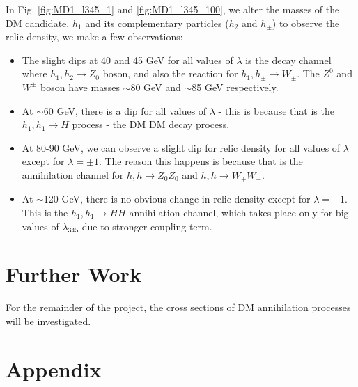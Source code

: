 \documentclass[12pt]{article}
\begin{document}
In Fig. \ref{fig:MD1_l345_1} and \ref{fig:MD1_l345_100}, we alter the masses of the DM candidate, $h_1$ and its complementary particles ($h_2$ and $h_{\pm}$) to observe the relic density, we make a few observations:
\begin{itemize}
    \item The slight dips at 40 and 45 GeV for all values of $\lambda$ is the decay channel where $h_1, h_2 \rightarrow Z_0$ boson, and also the reaction for $h_1, h_{\pm} \rightarrow W_\pm$. The $Z^0$ and $W^\pm$ boson have masses $\sim$80 GeV and $\sim$85 GeV respectively.
    \item At $\sim$60 GeV, there is a dip for all values of $\lambda$ - this is because that is the $h_1,h_1\rightarrow H$ process - the DM DM decay process. 
    \item At 80-90 GeV, we can observe a slight dip for relic density for all values of $\lambda$ except for $\lambda = \pm1$. The reason this happens is because that is the annihilation channel for $h, h \rightarrow Z_0Z_0$ and $h, h \rightarrow W_+ W_-$.
    \item At $\sim$120 GeV, there is no obvious change in relic density except for $\lambda = \pm1$. This is the $h_1,h_1\rightarrow H H$ annihilation channel, which takes place only for big values of $\lambda_{345}$ due to stronger coupling term.
\end{itemize}

\section{Further Work}
For the remainder of the project, the cross sections of DM annihilation processes will be investigated. 
\newpage



\newpage
\section{Appendix}
\end{document}

